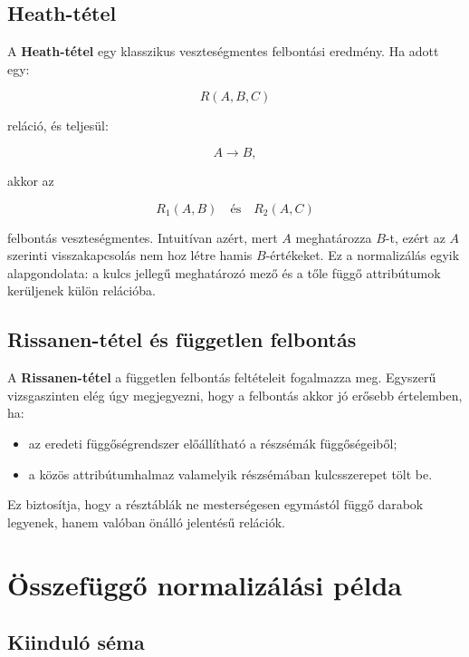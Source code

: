\begin{center}

\end{center}

\subsection{Heath-tétel}

A \textbf{Heath-tétel} egy klasszikus veszteségmentes felbontási eredmény. Ha adott egy:

\[
  R(A,B,C)
\]

reláció, és teljesül:

\[
  A \to B,
\]

akkor az

\[
  R_1(A,B) \quad \text{és} \quad R_2(A,C)
\]

felbontás veszteségmentes. Intuitívan azért, mert \(A\) meghatározza \(B\)-t, ezért az \(A\) szerinti visszakapcsolás nem hoz létre hamis \(B\)-értékeket. Ez a normalizálás egyik alapgondolata: a kulcs jellegű meghatározó mező és a tőle függő attribútumok kerüljenek külön relációba.

\subsection{Rissanen-tétel és független felbontás}

A \textbf{Rissanen-tétel} a független felbontás feltételeit fogalmazza meg. Egyszerű vizsgaszinten elég úgy megjegyezni, hogy a felbontás akkor jó erősebb értelemben, ha:

\begin{itemize}
  \item az eredeti függőségrendszer előállítható a részsémák függőségeiből;
  \item a közös attribútumhalmaz valamelyik részsémában kulcsszerepet tölt be.
\end{itemize}

Ez biztosítja, hogy a résztáblák ne mesterségesen egymástól függő darabok legyenek, hanem valóban önálló jelentésű relációk.

\section{Összefüggő normalizálási példa}

\subsection{Kiinduló séma}

